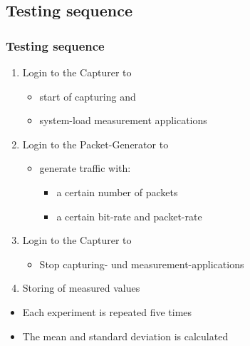 \documentclass{beamer}
\begin{document}
\subsection*{Testing sequence}
\begin{frame}
\frametitle{Testing sequence}
\begin{enumerate}
	\item Login to the Capturer to 
		\begin{itemize}
			\item start of capturing and 
			\item system-load measurement applications 
		\end{itemize}
	\item Login to the Packet-Generator to 

	\begin{itemize}
		\item generate traffic with:
				\begin{itemize}
					\item a certain number of packets
					\item a certain bit-rate and packet-rate
				\end{itemize}
	\end{itemize}

	\item Login to the Capturer to 
		\begin{itemize}
			\item Stop capturing- und measurement-applications
		\end{itemize}
	\item Storing of measured values
\end{enumerate}
\begin{itemize}
	\item Each experiment is repeated five times
	\item The mean and standard deviation is calculated
\end{itemize}
\end{frame}
\end{document}
